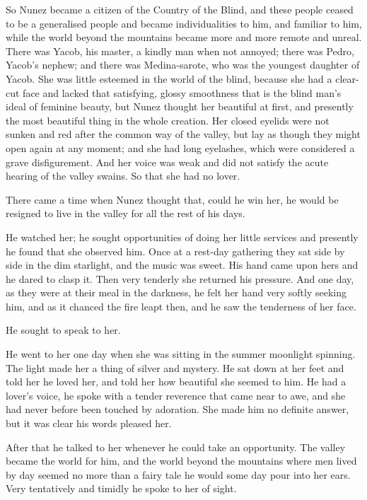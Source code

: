 \documentclass[courier]{sffms}
\begin{document}
So Nunez became a citizen of the Country of the Blind, and these
people ceased to be a generalised people and became individualities to
him, and familiar to him, while the world beyond the mountains became
more and more remote and unreal. There was Yacob, his master, a kindly
man when not annoyed; there was Pedro, Yacob's nephew; and there was
Medina-sarote, who was the youngest daughter of Yacob. She was little
esteemed in the world of the blind, because she had a clear-cut face
and lacked that satisfying, glossy smoothness that is the blind man's
ideal of feminine beauty, but Nunez thought her beautiful at first,
and presently the most beautiful thing in the whole creation. Her
closed eyelids were not sunken and red after the common way of the
valley, but lay as though they might open again at any moment; and she
had long eyelashes, which were considered a grave disfigurement. And
her voice was weak and did not satisfy the acute hearing of the valley
swains. So that she had no lover.

There came a time when Nunez thought that, could he win her, he would
be resigned to live in the valley for all the rest of his days.

He watched her; he sought opportunities of doing her little services
and presently he found that she observed him. Once at a rest-day
gathering they sat side by side in the dim starlight, and the music
was sweet. His hand came upon hers and he dared to clasp it. Then very
tenderly she returned his pressure. And one day, as they were at their
meal in the darkness, he felt her hand very softly seeking him, and as
it chanced the fire leapt then, and he saw the tenderness of her face.

He sought to speak to her.

He went to her one day when she was sitting in the summer moonlight
spinning.  The light made her a thing of silver and mystery. He sat
down at her feet and told her he loved her, and told her how beautiful
she seemed to him. He had a lover's voice, he spoke with a tender
reverence that came near to awe, and she had never before been touched
by adoration. She made him no definite answer, but it was clear his
words pleased her.

After that he talked to her whenever he could take an opportunity. The
valley became the world for him, and the world beyond the mountains
where men lived by day seemed no more than a fairy tale he would some
day pour into her ears. Very tentatively and timidly he spoke to her
of sight.
\end{document}
